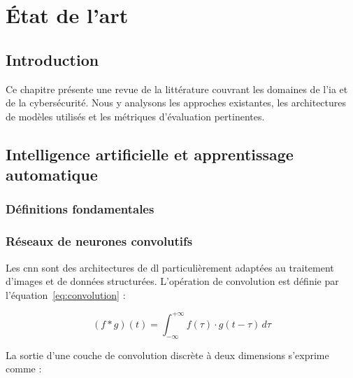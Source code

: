 \chapter{État de l'art}
\label{chap:etat_art}

\section*{Introduction}

Ce chapitre présente une revue de la littérature couvrant les domaines de l'\gls{ia} et de la cybersécurité. Nous y analysons les approches existantes, les architectures de modèles utilisés et les métriques d'évaluation pertinentes.

\section{Intelligence artificielle et apprentissage automatique}
\label{sec:ia_ml}

\subsection{Définitions fondamentales}


\subsection{Réseaux de neurones convolutifs}

Les \gls{cnn} sont des architectures de \gls{dl} particulièrement adaptées au traitement d'images et de données structurées. L'opération de convolution est définie par l'équation~\eqref{eq:convolution} :

\begin{equation}
  (f * g)(t) = \int_{-\infty}^{+\infty} f(\tau) \cdot g(t - \tau) \, d\tau
  \label{eq:convolution}
\end{equation}

La sortie d'une couche de convolution discrète à deux dimensions s'exprime comme :

